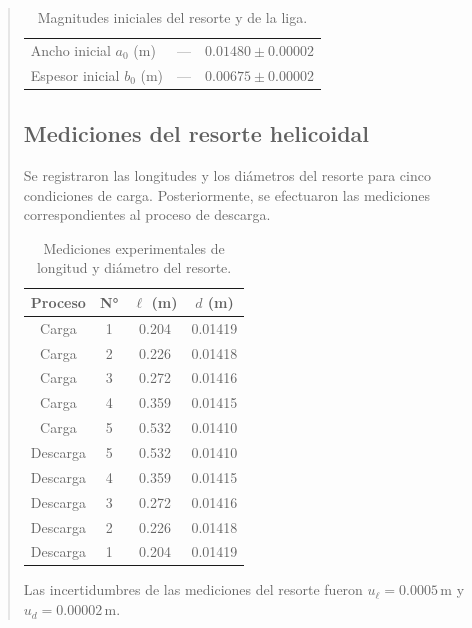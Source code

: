 \documentclass[11pt,a4paper]{article}
\begin{document}
\begin{quote}
\begin{table}[H]
\begin{tabular}{lcc}
        Ancho inicial $a_0$ (m) &
        --- &
        $0.01480 \pm 0.00002$ \\

        Espesor inicial $b_0$ (m) &
        --- &
        $0.00675 \pm 0.00002$ \\
        \bottomrule
    \end{tabular}
    \caption{Magnitudes iniciales del resorte y de
    la liga.}
    \label{tab:dimensiones_iniciales}
\end{table}

\subsection{Mediciones del resorte helicoidal}

Se registraron las longitudes y los diámetros del resorte
para cinco condiciones de carga. Posteriormente, se
efectuaron las mediciones correspondientes al proceso
de descarga.

\begin{table}[H]
    \centering
    \small
    \renewcommand{\arraystretch}{1.12}
    \setlength{\tabcolsep}{7pt}
    \begin{tabular}{cccc}
        \toprule
        \textbf{Proceso} &
        \textbf{N°} &
        \textbf{$\ell$ (m)} &
        \textbf{$d$ (m)} \\
        \midrule
        Carga    & 1 & 0.204 & 0.01419 \\
        Carga    & 2 & 0.226 & 0.01418 \\
        Carga    & 3 & 0.272 & 0.01416 \\
        Carga    & 4 & 0.359 & 0.01415 \\
        Carga    & 5 & 0.532 & 0.01410 \\
        \midrule
        Descarga & 5 & 0.532 & 0.01410 \\
        Descarga & 4 & 0.359 & 0.01415 \\
        Descarga & 3 & 0.272 & 0.01416 \\
        Descarga & 2 & 0.226 & 0.01418 \\
        Descarga & 1 & 0.204 & 0.01419 \\
        \bottomrule
    \end{tabular}
    \caption{Mediciones experimentales de longitud
    y diámetro del resorte.}
    \label{tab:datos_resorte}
\end{table}

\noindent
Las incertidumbres de las mediciones del resorte fueron
$u_{\ell}=0.0005\,\mathrm{m}$ y
$u_d=0.00002\,\mathrm{m}$.


\end{quote}
\end{document}
